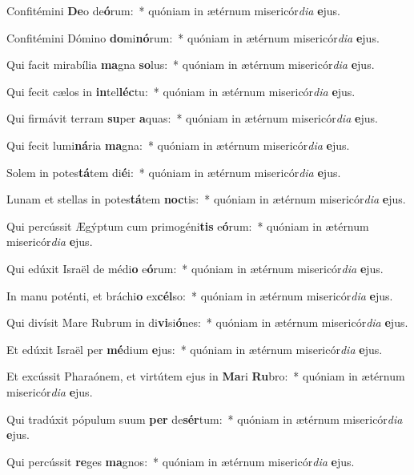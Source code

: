\item Confitémini \textbf{De}o de\textbf{ó}rum:~* quóniam in ætérnum misericór\textit{di}\textit{a} \textbf{e}jus.
\item Confitémini Dómino \textbf{do}mi\textbf{nó}rum:~* quóniam in ætérnum misericór\textit{di}\textit{a} \textbf{e}jus.
\item Qui facit mirabília \textbf{ma}gna \textbf{so}lus:~* quóniam in ætérnum misericór\textit{di}\textit{a} \textbf{e}jus.
\item Qui fecit cælos in \textbf{in}tel\textbf{léc}tu:~* quóniam in ætérnum misericór\textit{di}\textit{a} \textbf{e}jus.
\item Qui firmávit terram \textbf{su}per \textbf{a}quas:~* quóniam in ætérnum misericór\textit{di}\textit{a} \textbf{e}jus.
\item Qui fecit lumi\textbf{ná}ria \textbf{ma}gna:~* quóniam in ætérnum misericór\textit{di}\textit{a} \textbf{e}jus.
\item Solem in potes\textbf{tá}tem di\textbf{é}i:~* quóniam in ætérnum misericór\textit{di}\textit{a} \textbf{e}jus.
\item Lunam et stellas in potes\textbf{tá}tem \textbf{noc}tis:~* quóniam in ætérnum misericór\textit{di}\textit{a} \textbf{e}jus.
\item Qui percússit Ægýptum cum primogéni\textbf{tis} e\textbf{ó}rum:~* quóniam in ætérnum misericór\textit{di}\textit{a} \textbf{e}jus.
\item Qui edúxit Israël de médi\textbf{o} e\textbf{ó}rum:~* quóniam in ætérnum misericór\textit{di}\textit{a} \textbf{e}jus.
\item In manu poténti, et bráchi\textbf{o} ex\textbf{cél}so:~* quóniam in ætérnum misericór\textit{di}\textit{a} \textbf{e}jus.
\item Qui divísit Mare Rubrum in di\textbf{vi}si\textbf{ó}nes:~* quóniam in ætérnum misericór\textit{di}\textit{a} \textbf{e}jus.
\item Et edúxit Israël per \textbf{mé}dium \textbf{e}jus:~* quóniam in ætérnum misericór\textit{di}\textit{a} \textbf{e}jus.
\item Et excússit Pharaónem, et virtútem ejus in \textbf{Ma}ri \textbf{Ru}bro:~* quóniam in ætérnum misericór\textit{di}\textit{a} \textbf{e}jus.
\item Qui tradúxit pópulum suum \textbf{per} de\textbf{sér}tum:~* quóniam in ætérnum misericór\textit{di}\textit{a} \textbf{e}jus.
\item Qui percússit \textbf{re}ges \textbf{ma}gnos:~* quóniam in ætérnum misericór\textit{di}\textit{a} \textbf{e}jus.
